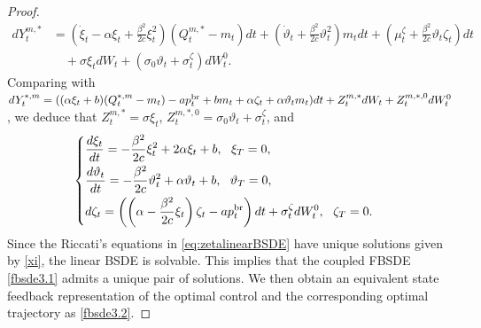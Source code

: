 \documentclass[11pt]{article}
\numberwithin{equation}{section}
\begin{document}
\begin{proof}
\begin{align*}
	dY_t^{m,*}%
	&=\left(\dot{\xi}_t-\alpha \xi_t+\frac{\beta^2}{2c}\xi_t^2\right)(Q_t^{m,*}-m_t)dt+\left(\dot{\vartheta}_t+\frac{\beta^2}{2c}\vartheta_t^2\right)m_tdt+\left(\mu_t^{\zeta}+\frac{\beta^2}{2c}\vartheta_t\zeta_t\right)dt\\
    &\quad+\sigma \xi_tdW_t+(\sigma_0\vartheta_t+\sigma_t^{\zeta})dW_t^0.
\end{align*}
Comparing with $dY_t^{*, m}=((\alpha \xi_t+b)(Q_t^{*, m}-m_t)- ap_t^{{\rm br}}+bm_t+\alpha \zeta_t+\alpha \vartheta_tm_t)dt+Z_t^{m,*}dW_t+Z_t^{m, *, 0}dW_t^0$, we deduce that $Z_t^{m, *}=\sigma \xi_t$, $Z_t^{m, *, 0}=\sigma_0\vartheta_t+\sigma_t^{\zeta}$, and 
\begin{align}\label{eq:zetalinearBSDE}
	\begin{cases}
		\displaystyle \frac{d\xi_t}{dt}=-\frac{\beta^2}{2c}\xi_t^2+2\alpha \xi_t+b,~~\xi_T=0,\\[0.6em]
		\displaystyle \frac{d{\vartheta}_t}{dt}=-\frac{\beta^2}{2c}\vartheta_t^2+\alpha \vartheta_t+b,~~\vartheta_T=0,\\[0.6em]
		\displaystyle d\zeta_t=\left(\left(\alpha-\frac{\beta^2}{2c}\xi_t\right)\zeta_t- ap_t^{{\rm br}}\right)dt+\sigma_t^{\zeta}dW_t^0,~~\zeta_T=0.
	\end{cases}
\end{align}
Since the Riccati's equations in \eqref{eq:zetalinearBSDE} have unique solutions given by \eqref{xi}, the linear BSDE is solvable. This implies that the coupled FBSDE \eqref{fbsde3.1} admits a unique pair of solutions. We then obtain an equivalent state feedback representation of the optimal control and the corresponding optimal trajectory as \eqref{fbsde3.2}.
\end{proof}	   
    
\end{document}
